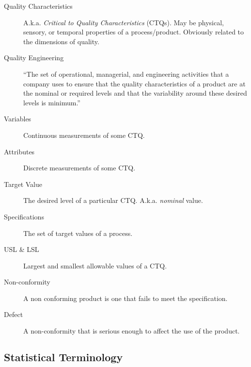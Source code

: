 \documentclass[12pt,a4paper]{report}
\begin{document}
\begin{description}
\item [Quality Characteristics] A.k.a. \emph{Critical to Quality Characteristics} (CTQs). May be physical, sensory, or temporal properties of a process/product. Obviously related to the dimensions of quality. 

\item [Quality Engineering] ``The set of operational, managerial, and engineering activities
that a company uses to ensure that the quality characteristics of a product are at the nominal
or required levels and that the variability around these desired levels is minimum.'' \citep{montgomery_introduction_2007}
\item [Variables] Continuous measurements of some CTQ.
\item [Attributes] Discrete measurements of some CTQ.
\item [Target Value] The desired level of a particular CTQ. A.k.a. \emph{nominal} value. 
\item [Specifications] The set of target values of a process. 
\item [USL \& LSL] Largest and smallest allowable values of a CTQ.
\item [Non-conformity] A non conforming product is one that fails to meet the specification.
\item [Defect] A non-conformity that is serious enough to affect the use of the product.
\end{description}




\subsection{Statistical Terminology}
\end{document}
